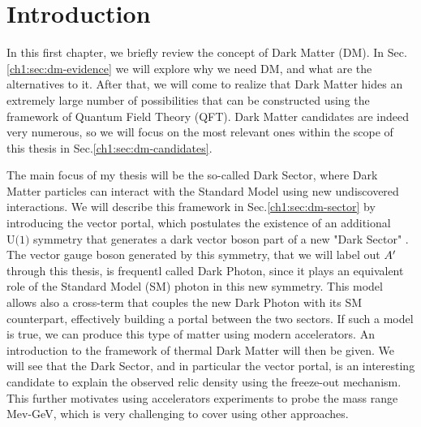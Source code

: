 
\newcommand{\pdirone}{chapters/plots/chapter1}

\chapter{Introduction}

\label{chapter1}

In this first chapter, we briefly review the concept of Dark Matter (DM). In Sec.\ref{ch1:sec:dm-evidence} we will explore why we need DM, and what are the alternatives to it. After that, we will come to realize that Dark Matter hides an extremely large number of possibilities that can be constructed using the framework of Quantum Field Theory (QFT). Dark Matter candidates are indeed very numerous, so we will focus on the most relevant ones within the scope of this thesis in Sec.\ref{ch1:sec:dm-candidates}.

The main focus of my thesis will be the so-called Dark Sector, where Dark Matter particles can interact with the Standard Model using new undiscovered interactions. We will describe this framework in Sec.\ref{ch1:sec:dm-sector}  by introducing the vector portal, which postulates the existence of an additional $\textrm{U(1)}$ symmetry that generates a dark vector boson part of a new "Dark Sector" . The vector gauge boson generated by this symmetry, that we will label out $A'$ through this thesis,  is frequentl called Dark Photon, since it plays an equivalent role of the Standard Model (SM) photon in this new symmetry. This model allows also a cross-term that couples the new Dark Photon with its SM counterpart, effectively building a portal between the two sectors. If such a model is true, we can produce this type of matter using modern accelerators. An introduction to the framework of thermal Dark Matter will then be given. We will see that the Dark Sector, and in particular the vector portal, is an interesting candidate to explain the observed relic density using the freeze-out mechanism. This further motivates using accelerators experiments to probe the mass range Mev-GeV, which is very challenging to cover using other approaches.

